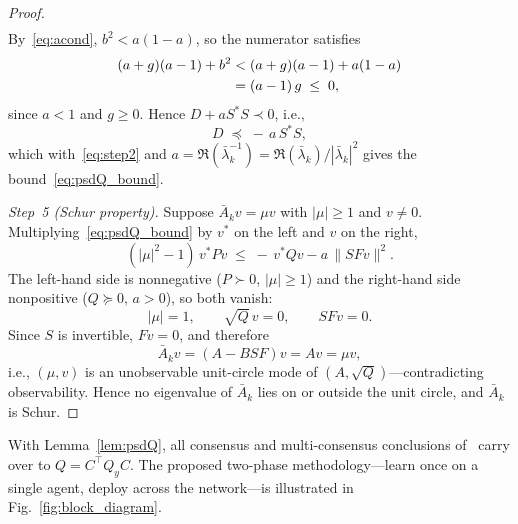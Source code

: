 \documentclass[final,5p,times]{elsarticle}
\theoremstyle{plain}
\theoremstyle{definition}
\theoremstyle{remark}
\begin{document}
\begin{proof}
\begin{align}
\label{eq:dg}
\end{align}
By~\eqref{eq:acond}, $b^2 < a(1-a)$, so the numerator satisfies
\begin{align}
(a+g)(a-1) + b^2
&< (a+g)(a-1) + a(1-a) \notag\\
&= (a-1)\,g \;\leq\; 0,
\label{eq:numneg}
\end{align}
since $a < 1$ and $g \geq 0$. Hence $D + aS^*S \prec 0$, i.e.,
\begin{equation}
D \;\preceq\; -\,a\, S^* S,
\label{eq:Dbound}
\end{equation}
which with~\eqref{eq:step2} and $a = \Re(\bar\lambda_k^{-1}) = \Re(\bar\lambda_k)/|\bar\lambda_k|^2$ gives the bound~\eqref{eq:psdQ_bound}.

\emph{Step~5 (Schur property).} Suppose $\bar{A}_k v = \mu v$ with $|\mu| \geq 1$ and $v \neq 0$. Multiplying~\eqref{eq:psdQ_bound} by $v^*$ on the left and $v$ on the right,
\begin{equation}
(|\mu|^2 - 1)\, v^* P v \;\leq\; -\,v^* Q v - a\,\|S F v\|^2.
\label{eq:vPv}
\end{equation}
The left-hand side is nonnegative ($P \succ 0$, $|\mu| \geq 1$) and the right-hand side nonpositive ($Q \succeq 0$, $a > 0$), so both vanish:
\begin{equation}
|\mu| = 1, \qquad \sqrt{Q}\,v = 0, \qquad S F v = 0.
\end{equation}
Since $S$ is invertible, $Fv = 0$, and therefore
\begin{equation}
\bar{A}_k v = (A - BSF)v = Av = \mu v,
\end{equation}
i.e., $(\mu, v)$ is an unobservable unit-circle mode of $(A, \sqrt{Q})$---contradicting observability. Hence no eigenvalue of $\bar{A}_k$ lies on or outside the unit circle, and $\bar{A}_k$ is Schur.
\end{proof}
With Lemma~\ref{lem:psdQ}, all consensus and multi-consensus conclusions of~\cite{cacace2024} carry over to $Q = C^\top Q_y C$. The proposed two-phase methodology---learn once on a single agent, deploy across the network---is illustrated in Fig.~\ref{fig:block_diagram}.
\end{document}
